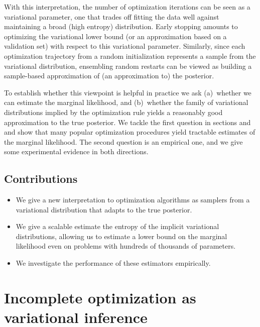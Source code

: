 \documentclass[]{article}
\begin{document}
With this interpretation, the number of optimization iterations can be seen as a variational parameter, one that trades off fitting the data well against maintaining a broad (high entropy) distribution.
Early stopping amounts to optimizing the variational lower bound (or an approximation based on a validation set) with respect to this variational parameter.
Similarly, since each optimization trajectory from a random initialization represents a sample from the variational distribution, ensembling random restarts can be viewed as building a sample-based approximation of (an approximation to) the posterior.

To establish whether this viewpoint is helpful in practice we ask (a)~whether we can estimate the marginal likelihood, and (b)~whether the family of variational distributions implied by the optimization rule yields a reasonably good approximation to the true posterior.
We tackle the first question in sections  and  and show that many popular optimization procedures yield tractable estimates of the marginal likelihood.
The second question is an empirical one, and we give some experimental evidence in both directions.

\subsection{Contributions}
\begin{itemize}
\item We give a new interpretation to optimization algorithms as samplers from a variational distribution that adapts to the true posterior.
\item We give a scalable estimate the entropy of the implicit variational distributions, allowing us to estimate a lower bound on the marginal likelihood even on problems with hundreds of thousands of parameters.
\item We investigate the performance of these estimators empirically.
\end{itemize}

\section{Incomplete optimization as variational inference}
\end{document}
